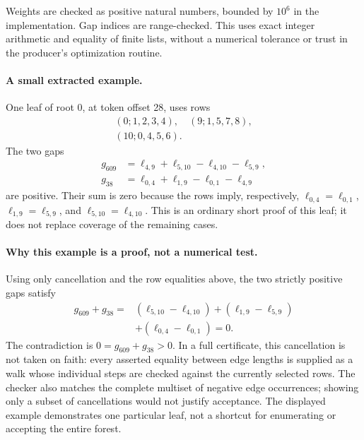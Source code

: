 \documentclass[11pt,a4paper]{article}
\theoremstyle{definition}
\begin{document}
Weights are checked as positive natural numbers, bounded by $10^6$ in the implementation. Gap indices are range-checked. This uses exact integer arithmetic and equality of finite lists, without a numerical tolerance or trust in the producer's optimization routine.

\paragraph{A small extracted example.}
One leaf of root 0, at token offset 28, uses rows
\[
 \begin{gathered}(0;1,2,3,4),\quad (9;1,5,7,8),\\
 (10;0,4,5,6).\end{gathered}
\]
The two gaps
\begin{align*}
 g_{609}&=\ell_{4,9}+\ell_{5,10}-\ell_{4,10}-\ell_{5,9},\\
 g_{38}&=\ell_{0,4}+\ell_{1,9}-\ell_{0,1}-\ell_{4,9}
\end{align*}
are positive. Their sum is zero because the rows imply, respectively,
$\ell_{0,4}=\ell_{0,1}$, $\ell_{1,9}=\ell_{5,9}$, and
$\ell_{5,10}=\ell_{4,10}$. This is an ordinary short proof of this leaf;
it does not replace coverage of the remaining cases.


\paragraph{Why this example is a proof, not a numerical test.}
Using only cancellation and the row equalities above, the two
strictly positive gaps satisfy
\[
\begin{aligned}
 g_{609}+g_{38}
  ={}&(\ell_{5,10}-\ell_{4,10})
  +(\ell_{1,9}-\ell_{5,9})\\
   &+(\ell_{0,4}-\ell_{0,1})=0.
\end{aligned}
\]
The contradiction is $0=g_{609}+g_{38}>0$. In a full certificate,
this cancellation is not taken on faith: every asserted equality
between edge lengths is supplied as a walk whose individual
steps are checked against the currently selected rows. The checker
also matches the complete multiset of negative edge occurrences;
showing only a subset of cancellations would not justify acceptance.
The displayed example demonstrates one particular leaf, not a
shortcut for enumerating or accepting the entire forest.
\end{document}

